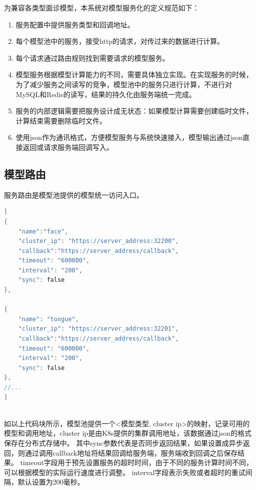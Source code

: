 为兼容各类型面诊模型，本系统对模型服务化的定义规范如下：
\begin{enumerate}

    \item 服务配置中提供服务类型和回调地址。

    \item 每个模型池中的服务，接受http的请求，对传过来的数据进行计算。

    \item 每个请求通过路由规则找到需要请求的模型服务。

    \item 模型服务根据模型计算能力的不同，需要具体独立实现。在实现服务的时候，为了减少服务之间读写的竞争，模型池中的服务只进行计算，不进行对MySQL和Redis的读写，结果的持久化由服务端统一完成。

    \item 服务的内部逻辑需要把服务设计成无状态：如果模型计算需要创建临时文件，计算结束需要删除临时文件。

    \item 使用json作为通讯格式，方便模型服务与系统快速接入，模型输出通过json直接返回或请求服务端回调写入。
\end{enumerate}

\subsection{模型路由}

服务路由是模型池提供的模型统一访问入口。
\begin{lstlisting}[language={C}, title=模型统一访问入口, label={lst:service-json}, basicstyle=\normalsize]
[
{
    "name":"face",
    "cluster_ip": "https://server_address:32200",
    "callback":"https://server_address/callback",
    "timeout": "600000",
    "interval": "200",
    "sync": false
}, 

{
    "name": "tongue",
    "cluster_ip": "https://server_address:32201",
    "callback":"https://server_address/callback",
    "timeout": "600000",
    "interval": "200",
    "sync": false
},
//...
]
    
\end{lstlisting}

如以上代码块所示，模型池提供一个<模型类型, cluster ip>的映射，记录可用的模型和调用地址，cluster ip是由K8s提供的集群调用地址，该数据通过json的格式保存在分布式存储中。
其中sync参数代表是否同步返回结果，如果设置成异步返回，则通过调用callback地址将结果回调给服务端，服务端收到回调之后保存结果。
timeout字段用于预先设置服务的超时时间，由于不同的服务计算时间不同，可以根据模型的实际运行速度进行调整。
interval字段表示失败或者超时的重试间隔，默认设置为200毫秒。

